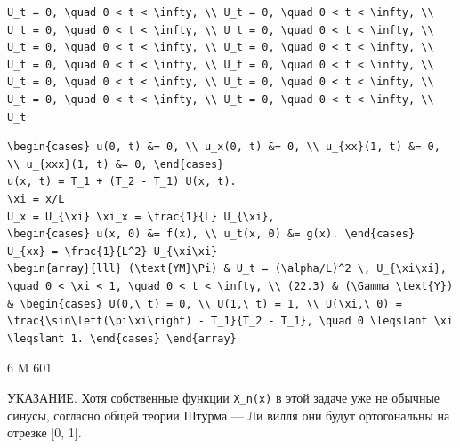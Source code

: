 \documentclass[
  ukrainian,
]{article}
\begin{document}
\begin{verbatim}
U_t = 0, \quad 0 < t < \infty, \\ U_t = 0, \quad 0 < t < \infty, \\ U_t = 0, \quad 0 < t < \infty, \\ U_t = 0, \quad 0 < t < \infty, \\ U_t = 0, \quad 0 < t < \infty, \\ U_t = 0, \quad 0 < t < \infty, \\ U_t = 0, \quad 0 < t < \infty, \\ U_t = 0, \quad 0 < t < \infty, \\ U_t = 0, \quad 0 < t < \infty, \\ U_t = 0, \quad 0 < t < \infty, \\ U_t = 0, \quad 0 < t < \infty, \\ U_t = 0, \quad 0 < t < \infty, \\ U_t
\end{verbatim}

\begin{verbatim}
\begin{cases} u(0, t) &= 0, \\ u_x(0, t) &= 0, \\ u_{xx}(1, t) &= 0, \\ u_{xxx}(1, t) &= 0, \end{cases}
u(x, t) = T_1 + (T_2 - T_1) U(x, t).
\xi = x/L
U_x = U_{\xi} \xi_x = \frac{1}{L} U_{\xi},
\begin{cases} u(x, 0) &= f(x), \\ u_t(x, 0) &= g(x). \end{cases}
U_{xx} = \frac{1}{L^2} U_{\xi\xi}
\begin{array}{lll} (\text{YM}\Pi) & U_t = (\alpha/L)^2 \, U_{\xi\xi}, \quad 0 < \xi < 1, \quad 0 < t < \infty, \\ (22.3) & (\Gamma \text{Y}) & \begin{cases} U(0,\ t) = 0, \\ U(1,\ t) = 1, \\ U(\xi,\ 0) = \frac{\sin\left(\pi\xi\right) - T_1}{T_2 - T_1}, \quad 0 \leqslant \xi \leqslant 1. \end{cases} \end{array}
\end{verbatim}

6 M 601

УКАЗАНИЕ. Хотя собственные функции \texttt{X\_n(x)} в этой задаче уже не
обычные синусы, согласно общей теории Штурма --- Ли вилля они будут
ортогональны на отрезке {[}0, 1{]}.
\end{document}
